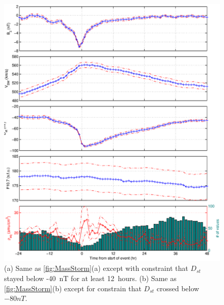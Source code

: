 \documentclass[10pt,twocolumn]{article}
\begin{document}
\begin{figure}[htp!]
\includegraphics[scale=0.5]{paperfigures/stormavs-d80.eps}
\caption{(a) Same as \ref{fig:MassStorm}(a) except with constraint that $D_{st}$ stayed below -40~nT for at least 12~hours. (b) Same as \ref{fig:MassStorm}(b) except for constrain that $D_{st}$ crossed below $-80 nT$.}
\label{Mspec}
\end{figure}
\clearpage
\end{document}
